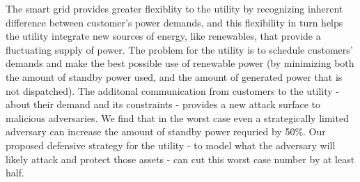 \documentclass[conference]{IEEEtran}
\begin{document}
The smart grid provides greater flexiblity to the utility by recognizing inherent difference between customer's power demands, and this flexibility in turn helps the utility integrate new sources of energy, like renewables, that provide a fluctuating supply of power.  The problem for the utility is to schedule customers' demands and make the best possible use of renewable power (by minimizing both the amount of standby power used, and the amount of generated power that is not dispatched).  The additonal communication from customers to the utility - about their demand and its constraints - provides a new attack surface to malicious adversaries.  We find that in the worst case even a strategically limited adversary can increase the amount of standby power requried by 50\%.  Our proposed defensive strategy for the utility - to model what the adversary will likely attack and protect those assets - can cut this worst case number by at least half.



\end{document}
